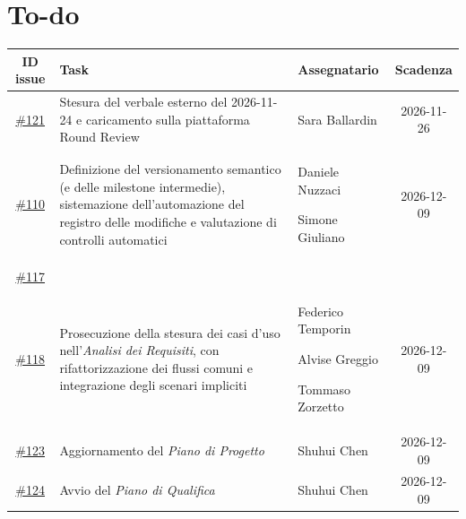 \documentclass[11pt, a4paper]{article}
\begin{document}
\section{To-do}
\begin{table}[h]
    \centering
    \renewcommand{\arraystretch}{1.5}
    \begin{tabularx}{\textwidth}{|c|>{\raggedright\arraybackslash}X|>{\centering\arraybackslash}p{3.5cm}|c|}
        \hline
        \rowcolor{gray!10}
        \textbf{ID issue} &
        \textbf{Task} &
        \textbf{Assegnatario} &
        \textbf{Scadenza} \\
        \hline
        \href{https://github.com/On-By-One-Team/On-By-One.github.io/issues/121}{\#121} & Stesura del verbale esterno del 2026-11-24 e caricamento sulla piattaforma Round Review & Sara Ballardin & 2026-11-26 \\
        \hline
        \href{https://github.com/On-By-One-Team/On-By-One.github.io/issues/110}{\#110} & Definizione del versionamento semantico (e delle milestone intermedie), sistemazione dell'automazione del registro delle modifiche e valutazione di controlli automatici & Daniele Nuzzaci \par Simone Giuliano & 2026-12-09 \\
        \hline
        \begin{tabular}[t]{@{}c@{}}
            \href{https://github.com/On-By-One-Team/On-By-One.github.io/issues/105}{\#105} \\
            \href{https://github.com/On-By-One-Team/On-By-One.github.io/issues/117}{\#117} \\
            \href{https://github.com/On-By-One-Team/On-By-One.github.io/issues/118}{\#118}
        \end{tabular} & Prosecuzione della stesura dei casi d'uso nell'\textit{Analisi dei Requisiti}, con rifattorizzazione dei flussi comuni e integrazione degli scenari impliciti & Federico Temporin \par Alvise Greggio \par Tommaso Zorzetto & 2026-12-09 \\
        \hline
        \href{https://github.com/On-By-One-Team/On-By-One.github.io/issues/123}{\#123} & Aggiornamento del \textit{Piano di Progetto} & Shuhui Chen & 2026-12-09 \\
        \hline
        \href{https://github.com/On-By-One-Team/On-By-One.github.io/issues/124}{\#124} & Avvio del \textit{Piano di Qualifica} & Shuhui Chen & 2026-12-09 \\

\end{tabularx}
\end{table}
\end{document}

